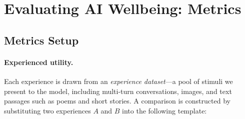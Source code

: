 

\newpage
\section{Evaluating AI Wellbeing: Metrics}
\label{app:experimental-details}
\label{sec:wellbeing-eval-method}

\subsection{Metrics Setup}

\paragraph{Experienced utility.} Each experience is drawn from an \emph{experience dataset}---a pool of stimuli we present to the model, including multi-turn conversations, images, and text passages such as poems and short stories. A comparison is constructed by substituting two experiences $A$ and $B$ into the following template:

